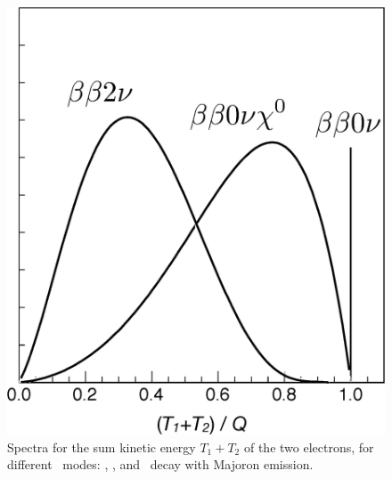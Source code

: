 \begin{figure}[t]
\vspace{1cm}
\begin{center}
\includegraphics[angle=0,scale=0.325]{img/modes.eps}
\end{center}
\caption{Spectra for the sum kinetic energy $T_1+T_2$ of the two electrons, for different \bb\ modes: \bbtnu, \bbonu, and \bb\ decay with Majoron emission.} \label{fig:modes}
\end{figure}

